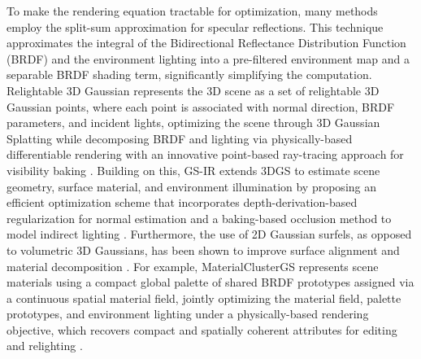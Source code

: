 \documentclass[11pt]{article}
\begin{document}
To make the rendering equation tractable for optimization, many methods employ the split-sum approximation for specular reflections. This technique approximates the integral of the Bidirectional Reflectance Distribution Function (BRDF) and the environment lighting into a pre-filtered environment map and a separable BRDF shading term, significantly simplifying the computation. Relightable 3D Gaussian represents the 3D scene as a set of relightable 3D Gaussian points, where each point is associated with normal direction, BRDF parameters, and incident lights, optimizing the scene through 3D Gaussian Splatting while decomposing BRDF and lighting via physically-based differentiable rendering with an innovative point-based ray-tracing approach for visibility baking \cite{ref567}. Building on this, GS-IR extends 3DGS to estimate scene geometry, surface material, and environment illumination by proposing an efficient optimization scheme that incorporates depth-derivation-based regularization for normal estimation and a baking-based occlusion method to model indirect lighting \cite{ref568}. Furthermore, the use of 2D Gaussian surfels, as opposed to volumetric 3D Gaussians, has been shown to improve surface alignment and material decomposition \cite{ref569}. For example, MaterialClusterGS represents scene materials using a compact global palette of shared BRDF prototypes assigned via a continuous spatial material field, jointly optimizing the material field, palette prototypes, and environment lighting under a physically-based rendering objective, which recovers compact and spatially coherent attributes for editing and relighting \cite{ref570}.
\end{document}
